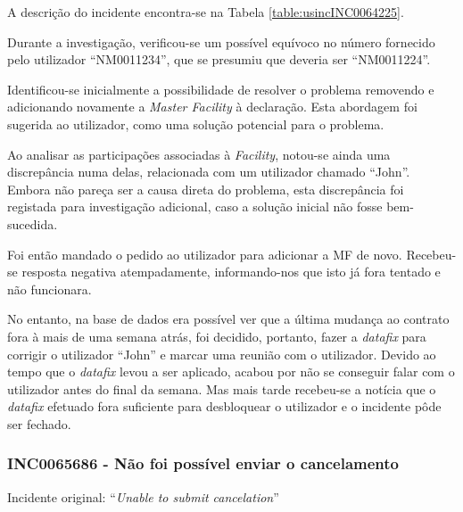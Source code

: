             A descrição do incidente encontra-se na Tabela \ref{table:usincINC0064225}.

            Durante a investigação, verificou-se um possível equívoco no número fornecido pelo utilizador ``NM0011234'', que se presumiu que deveria ser ``NM0011224''. 

            Identificou-se inicialmente a possibilidade de resolver o problema removendo e adicionando novamente a \textit{Master Facility} à declaração. Esta abordagem foi sugerida ao utilizador, como uma solução potencial para o problema.
            
            Ao analisar as participações associadas à \textit{Facility}, notou-se ainda uma discrepância numa delas, relacionada com um utilizador chamado ``John''. Embora não pareça ser a causa direta do problema, esta discrepância foi registada para investigação adicional, caso a solução inicial não fosse bem-sucedida.

            Foi então mandado o pedido ao utilizador para adicionar a MF de novo. Recebeu-se resposta negativa atempadamente, informando-nos que isto já fora tentado e não funcionara.
            
            No entanto, na base de dados era possível ver que a última mudança ao contrato fora à mais de uma semana atrás, foi decidido, portanto, fazer a \textit{datafix} para corrigir o utilizador ``John'' e marcar uma reunião com o utilizador. Devido ao tempo que o \textit{datafix} levou a ser aplicado, acabou por não se conseguir falar com o utilizador antes do final da semana. Mas mais tarde recebeu-se a notícia que o \textit{datafix} efetuado fora suficiente para desbloquear o utilizador e o incidente pôde ser fechado.
            
        \subsubsection{INC0065686 - Não foi possível enviar o cancelamento}\label{secsec:inc0065686} %
                
            Incidente original: ``\textit{Unable to submit cancelation}''

